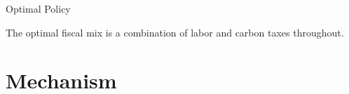 \documentclass[11pt,aspectratio=169]{beamer}
\begin{document}
\begin{frame}{Optimal Policy}
\begin{figure}[h!!]
\begin{subfigure}{0.4\textwidth}
	\end{subfigure}
\end{figure}
\vspace{3mm}
\begin{block}{}
	The optimal fiscal mix is a combination of labor and carbon taxes throughout. 
\end{block}	
\end{frame}

\hypertarget{benf}{}
\section*{Mechanism}
\end{document}
